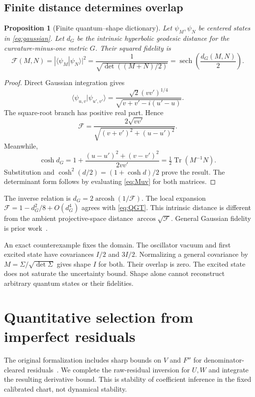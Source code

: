\documentclass[11pt]{article}
\newtheorem{proposition}[theorem]{Proposition}
\newcommand{\Tr}{\operatorname{Tr}}
\newcommand{\sech}{\operatorname{sech}}
\newcommand{\arcosh}{\operatorname{arcosh}}
\begin{document}
\subsection{Finite distance determines overlap}
\begin{proposition}[Finite quantum--shape dictionary]
Let $\psi_M,\psi_N$ be centered states in \eqref{eq:gaussian}. Let $d_G$ be the intrinsic hyperbolic geodesic distance for the curvature-minus-one metric $G$. Their \emph{squared fidelity} is
\begin{equation}\label{eq:fidelity}
\boxed{\mathscr F(M,N)=|\langle\psi_M|\psi_N\rangle|^2
=\frac1{\sqrt{\det((M+N)/2)}}=\sech\!\left(\frac{d_G(M,N)}2\right).}
\end{equation}
\end{proposition}
\begin{proof}
Direct Gaussian integration gives
\[
\langle\psi_{u,v}|\psi_{u',v'}\rangle
=\frac{\sqrt2(vv')^{1/4}}{\sqrt{v+v'-i(u'-u)}}.
\]
The square-root branch has positive real part. Hence
\[
\mathscr F=\frac{2\sqrt{vv'}}{\sqrt{(v+v')^2+(u-u')^2}}.
\]
Meanwhile,
\[
\cosh d_G=1+\frac{(u-u')^2+(v-v')^2}{2vv'}=\tfrac12\Tr(M^{-1}N).
\]
Substitution and $\cosh^2(d/2)=(1+\cosh d)/2$ prove the result. The determinant form follows by evaluating \eqref{eq:Muv} for both matrices.
\end{proof}
The inverse relation is $d_G=2\arcosh(1/\mathscr F)$. The local expansion $\mathscr F=1-d_G^2/8+O(d_G^4)$ agrees with \eqref{eq:QGT}. This intrinsic distance is different from the ambient projective-space distance $\arccos\sqrt{\mathscr F}$. General Gaussian fidelity is prior work~\cite{Banchi}.

An exact counterexample fixes the domain. The oscillator vacuum and first excited state have covariances $I/2$ and $3I/2$. Normalizing a general covariance by $M=\Sigma/\sqrt{\det\Sigma}$ gives shape $I$ for both. Their overlap is zero. The excited state does not saturate the uncertainty bound. Shape alone cannot reconstruct arbitrary quantum states or their fidelities.

\section{Quantitative selection from imperfect residuals}
The original formalization includes sharp bounds on $V$ and $F''$ for denominator-cleared residuals~\cite{Voss24}. We complete the raw-residual inversion for $U,W$ and integrate the resulting derivative bound. This is stability of coefficient inference in the fixed calibrated chart, not dynamical stability.
\end{document}
